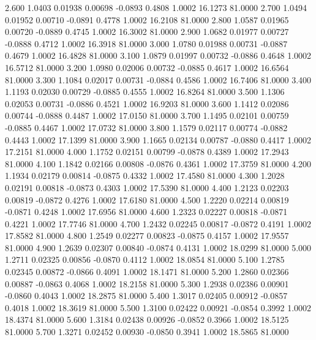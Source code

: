    2.600   1.0403   0.01938   0.00698  -0.0893   0.4808   1.0002  16.1273  81.0000
   2.700   1.0494   0.01952   0.00710  -0.0891   0.4778   1.0002  16.2108  81.0000
   2.800   1.0587   0.01965   0.00720  -0.0889   0.4745   1.0002  16.3002  81.0000
   2.900   1.0682   0.01977   0.00727  -0.0888   0.4712   1.0002  16.3918  81.0000
   3.000   1.0780   0.01988   0.00731  -0.0887   0.4679   1.0002  16.4828  81.0000
   3.100   1.0879   0.01997   0.00732  -0.0886   0.4648   1.0002  16.5712  81.0000
   3.200   1.0980   0.02006   0.00732  -0.0885   0.4617   1.0002  16.6564  81.0000
   3.300   1.1084   0.02017   0.00731  -0.0884   0.4586   1.0002  16.7406  81.0000
   3.400   1.1193   0.02030   0.00729  -0.0885   0.4555   1.0002  16.8264  81.0000
   3.500   1.1306   0.02053   0.00731  -0.0886   0.4521   1.0002  16.9203  81.0000
   3.600   1.1412   0.02086   0.00744  -0.0888   0.4487   1.0002  17.0150  81.0000
   3.700   1.1495   0.02101   0.00759  -0.0885   0.4467   1.0002  17.0732  81.0000
   3.800   1.1579   0.02117   0.00774  -0.0882   0.4443   1.0002  17.1399  81.0000
   3.900   1.1665   0.02134   0.00787  -0.0880   0.4417   1.0002  17.2151  81.0000
   4.000   1.1752   0.02151   0.00799  -0.0878   0.4389   1.0002  17.2943  81.0000
   4.100   1.1842   0.02166   0.00808  -0.0876   0.4361   1.0002  17.3759  81.0000
   4.200   1.1934   0.02179   0.00814  -0.0875   0.4332   1.0002  17.4580  81.0000
   4.300   1.2028   0.02191   0.00818  -0.0873   0.4303   1.0002  17.5390  81.0000
   4.400   1.2123   0.02203   0.00819  -0.0872   0.4276   1.0002  17.6180  81.0000
   4.500   1.2220   0.02214   0.00819  -0.0871   0.4248   1.0002  17.6956  81.0000
   4.600   1.2323   0.02227   0.00818  -0.0871   0.4221   1.0002  17.7746  81.0000
   4.700   1.2432   0.02245   0.00817  -0.0872   0.4191   1.0002  17.8582  81.0000
   4.800   1.2549   0.02277   0.00823  -0.0875   0.4157   1.0002  17.9557  81.0000
   4.900   1.2639   0.02307   0.00840  -0.0874   0.4131   1.0002  18.0299  81.0000
   5.000   1.2711   0.02325   0.00856  -0.0870   0.4112   1.0002  18.0854  81.0000
   5.100   1.2785   0.02345   0.00872  -0.0866   0.4091   1.0002  18.1471  81.0000
   5.200   1.2860   0.02366   0.00887  -0.0863   0.4068   1.0002  18.2158  81.0000
   5.300   1.2938   0.02386   0.00901  -0.0860   0.4043   1.0002  18.2875  81.0000
   5.400   1.3017   0.02405   0.00912  -0.0857   0.4018   1.0002  18.3619  81.0000
   5.500   1.3100   0.02422   0.00921  -0.0854   0.3992   1.0002  18.4374  81.0000
   5.600   1.3184   0.02438   0.00926  -0.0852   0.3966   1.0002  18.5125  81.0000
   5.700   1.3271   0.02452   0.00930  -0.0850   0.3941   1.0002  18.5865  81.0000
